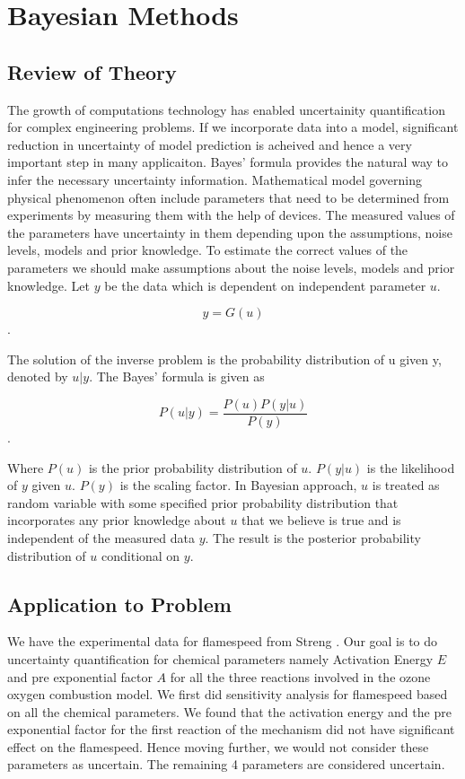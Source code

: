 \chapter{Bayesian Methods}
\section{Review of Theory}

The growth of computations technology has enabled uncertainity quantification for complex engineering problems. If we  incorporate data into a model, significant reduction in uncertainty of model prediction is acheived and hence a very important step in many applicaiton. Bayes' formula provides the natural way to infer the necessary uncertainty information. Mathematical model governing physical phenomenon often include parameters that need to be determined from experiments by measuring them with the help of devices. The measured values of the parameters have uncertainty in them depending upon the assumptions, noise levels, models and prior knowledge. To estimate the correct values of the parameters we should make assumptions about the noise levels, models and prior knowledge. Let $y$ be the data which is dependent on independent parameter $u$. 

$$y = G(u)$$. 

\noindent The solution of the inverse problem is the probability distribution of u given y, denoted by $u|y$. The Bayes' formula is given as 

$$P(u|y) = \frac{P(u) P(y|u)}{P(y)}$$ .
 
 \bigskip
 
\noindent Where $P(u)$ is the prior probability distribution of $u$. $P(y|u)$ is the likelihood of $y$ given $u$. $P(y)$ is the scaling factor. 
 \noindent In Bayesian approach, $u$ is treated as random variable with some specified prior probability distribution that incorporates any prior knowledge about $u$ that we believe is true and is independent of the measured data $y$. The result is the posterior probability distribution of $u$ conditional on $y$.

\section{Application to Problem}

\noindent We have the experimental data for flamespeed from Streng \cite{Streng}. Our goal is to do uncertainty quantification for chemical parameters namely Activation Energy $ E $ and pre exponential factor $ A $ for all the three reactions involved in the ozone oxygen combustion model. We first did sensitivity analysis for flamespeed based on all the chemical parameters. We found that the activation energy and the pre exponential factor for the first reaction of the mechanism did not have significant effect on the flamespeed. Hence moving further, we would not consider these parameters as uncertain. The remaining 4 parameters are considered uncertain. 

